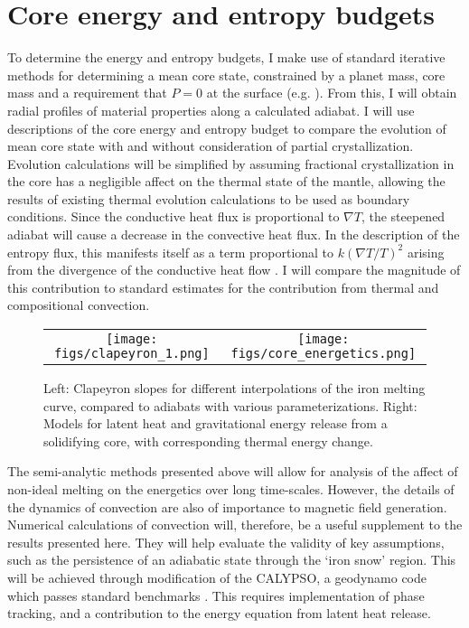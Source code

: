 \section{Core energy and entropy budgets} \label{budget}

To determine the energy and entropy budgets, I make use of standard iterative
methods for determining a mean core state, constrained by a planet mass, core
mass and a requirement that $P=0$ at the surface (e.g. \citet{Lister1995}). From
this, I will obtain radial profiles of material properties along a calculated
adiabat.  I will use descriptions of the core energy and entropy budget
\citep{Gubbins1979,Lister1995,Lister2003} to compare the evolution of mean core state
with and without consideration of partial crystallization. Evolution
calculations will be simplified by assuming fractional crystallization in the
core has a negligible affect on the thermal state of the mantle, allowing the
results of existing thermal evolution calculations \citep{Hauck2004,Breuer2007} to
be used as boundary conditions. Since the conductive heat flux is proportional
to $\nabla T$, the steepened adiabat will cause a decrease in the convective
heat flux. In the description of the entropy flux, this manifests itself as a
term proportional to $k\left(\nabla T / T \right)^2$ arising from the
divergence of the conductive heat flow \citep{Lister2003}. I will compare the
magnitude of this contribution to standard estimates for the contribution from
thermal and compositional convection.


 \begin{figure}[h] %
   \centering
\begin{tabular}{cc}
 \texttt{[image: figs/clapeyron\_1.png]} &
 \texttt{[image: figs/core\_energetics.png]} \\
\end{tabular}
\caption{Left: Clapeyron slopes for different interpolations of the iron
melting curve, compared to adiabats with various parameterizations.  Right:  Models
for latent heat and gravitational energy release from a solidifying core, with
corresponding thermal energy change.}
\label{fig:core_energy}
\end{figure}

The semi-analytic methods presented above will allow for analysis of the
affect of non-ideal melting on the energetics over long time-scales. However,
the details of the dynamics of convection are also of importance to magnetic field
generation. Numerical calculations of convection will, therefore, be a useful
supplement to the results presented here. They will help evaluate the validity of
key assumptions, such as the persistence of an adiabatic state through the
`iron snow' region. This will be achieved through modification of the CALYPSO,
a geodynamo code which passes standard benchmarks \citep{Christensen2001}. This
requires implementation of phase tracking, and a contribution to the energy
equation from latent heat release. 




